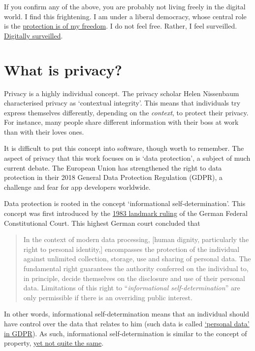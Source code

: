 \documentclass[
]{book}
\begin{document}
If you confirm any of the above, you are probably not living freely in the digital world. I find this frightening. I am under a liberal democracy, whose central role is the \href{https://oll.libertyfund.org/quotes/497}{protection is of my freedom}. I do not feel free. Rather, I feel surveilled. \href{https://www.theguardian.com/books/2019/feb/02/age-of-surveillance-capitalism-shoshana-zuboff-review}{Digitally surveilled}.

\hypertarget{what-is-privacy}{%
\section{What is privacy?}\label{what-is-privacy}}

Privacy is a highly individual concept. The privacy scholar Helen Nissenbaum characterised privacy as `contextual integrity'. This means that individuals try express themselves differently, depending on the \emph{context}, to protect their privacy. For instance, many people share different information with their boss at work than with their loves ones.

It is difficult to put this concept into software, though worth to remember. The aspect of privacy that this work focuses on is `data protection', a subject of much current debate. The European Union has strengthened the right to data protection in their 2018 General Data Protection Regulation (GDPR), a challenge and fear for app developers worldwide.

Data protection is rooted in the concept `informational self-determination'. This concept was first introduced by the \href{https://www.bundesverfassungsgericht.de/SharedDocs/Entscheidungen/EN/1983/12/rs19831215_1bvr020983en.html}{1983 landmark ruling} of the German Federal Constitutional Court. This highest German court concluded that

\begin{quote}
In the context of modern data processing, {[}human dignity, particularly the right to personal identity,{]} encompasses the protection of the individual against unlimited collection, storage, use and sharing of personal data. The fundamental right guarantees the authority conferred on the individual to, in principle, decide themselves on the disclosure and use of their personal data. Limitations of this right to ``\emph{informational self-determination}'' are only permissible if there is an overriding public interest.
\end{quote}

In other words, informational self-determination means that an individual should have control over the data that relates to him (such data is called \href{https://gdpr-info.eu/art-4-gdpr/}{`personal data' in GDPR}). As such, informational self-determination is similar to the concept of property, \href{https://leidenlawblog.nl/articles/privacy-and-property-do-you-really-own-your-personal-data}{yet not quite the same}.
\end{document}
